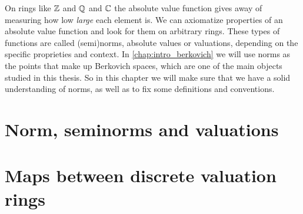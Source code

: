 On rings like $\mathbb{Z}$ and $\mathbb{Q}$ and $\mathbb{C}$ the absolute value function gives away of measuring how low \emph{large} each element is. 
We can axiomatize properties of an absolute value function and look for them on arbitrary rings. 
These types of functions are called (semi)norms, absolute values or valuations, depending on the specific proprieties and context.  
In \cref{chap:intro_berkovich} we will use norms as the points that make up Berkovich spaces, which are one of the main objects studied in this thesis. 
So in this chapter we will make sure that we have a solid understanding of norms, as well as to fix some definitions and conventions.

\section{Norm, seminorms and valuations} \label{sec:norm,_seminorms_and_valuations}


\section{Maps between discrete valuation rings} \label{sec:maps_between_discrete_valuation_rings}


